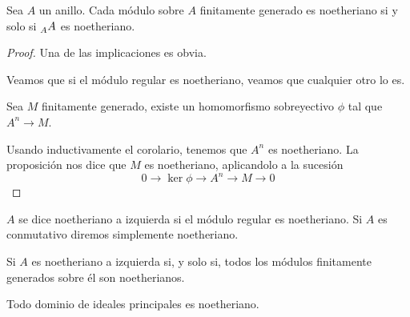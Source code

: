 \begin{teo}
  Sea \(A\) un anillo. Cada módulo sobre \(A\) finitamente generado
  es noetheriano si y solo si \(\prescript{}{A}{A}\) es noetheriano.
\end{teo}

\begin{proof}
  Una de las implicaciones es obvia.

  Veamos que si el módulo regular es noetheriano, veamos que cualquier otro
  lo es.

  Sea \(M\) finitamente generado, existe un homomorfismo sobreyectivo \(\phi\)
  tal que \(A^n\longrightarrow M\).

  Usando inductivamente el corolario, tenemos que \(A^n\) es noetheriano.
  La proposición nos dice que \(M\) es noetheriano, aplicandolo
  a la sucesión
  \[
    0\longrightarrow\ker\phi\longrightarrow A^n\longrightarrow
    M\longrightarrow 0
  \]
\end{proof}

\begin{df}
  \(A\) se dice noetheriano a izquierda si el módulo regular es
  noetheriano. Si \(A\) es conmutativo diremos simplemente noetheriano.
\end{df}

\begin{cor}
  Si \(A\) es noetheriano a izquierda si, y solo si, todos los módulos finitamente
  generados sobre él son noetherianos.
\end{cor}

\begin{cor}
  Todo dominio de ideales principales es noetheriano.
\end{cor}
